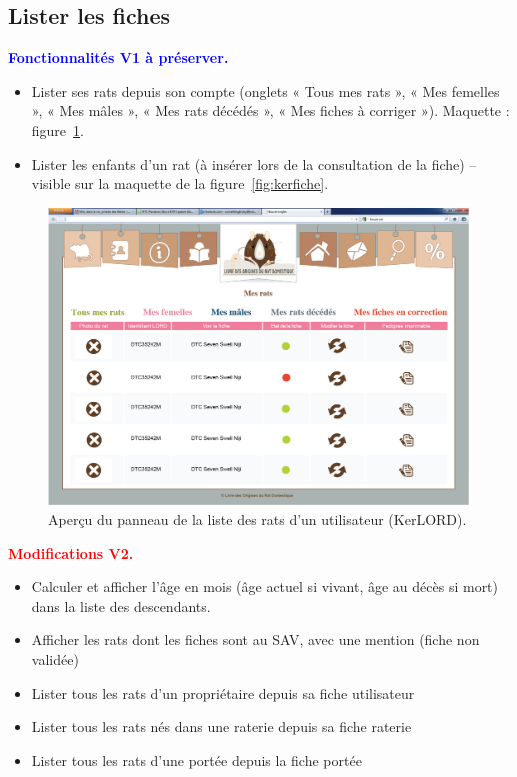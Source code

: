 \documentclass[a4paper,10pt]{article}
\newcommand\existant[1]{\noindent\textbf{\textcolor{blue}{#1}}}
\newcommand\desire[1]{\noindent\textbf{\textcolor{red}{#1}}}
\begin{document}
\subsection{Lister les fiches}
\existant{Fonctionnalités V1 à préserver.}
\begin{itemize}
\item Lister ses rats depuis son compte (onglets « Tous mes rats », « Mes femelles », « Mes mâles », « Mes rats décédés », « Mes fiches à corriger »). Maquette : figure~\ref{fig:kerdashuser}.   
\item Lister les enfants d'un rat (à insérer lors de la consultation de la fiche)  -- visible sur la maquette de la figure~\ref{fig:kerfiche}.
\end{itemize}

\begin{figure}[htbp!]
\begin{center}\includegraphics[width=0.8\linewidth]{DashboardUser.jpg}\end{center}
\caption{Aperçu du panneau de la liste des rats d'un utilisateur (KerLORD).\label{fig:kerdashuser}}
\end{figure}

\desire{Modifications V2.}
\begin{itemize}
\item Calculer et afficher l'âge en mois (âge actuel si vivant, âge au décès si mort) dans la liste des descendants.
\item Afficher les rats dont les fiches sont au SAV, avec une mention (fiche non validée) 
\item Lister tous les rats d'un propriétaire depuis sa fiche utilisateur
\item Lister tous les rats nés dans une raterie depuis sa fiche raterie
\item Lister tous les rats d'une portée depuis la fiche portée
\end{itemize}
\end{document}
